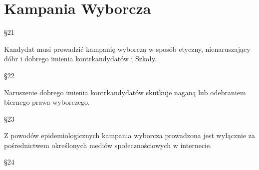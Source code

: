 \documentclass[12pt]{article}
\begin{document}
\section{Kampania Wyborcza}
    \begin{center}
        \S 21\\
    \end{center} 
    Kandydat musi prowadzić kampanię wyborczą w sposób etyczny, nienaruszający dóbr i dobrego imienia kontrkandydatów  i Szkoły.\\
    \begin{center}
        \S 22\\
    \end{center} 
    Naruszenie dobrego imienia kontrkandydatów skutkuje naganą lub odebraniem biernego prawa wyborczego.\\
    \begin{center}
        \S 23\\
    \end{center} 
    Z powodów epidemiologicznych kampania wyborcza prowadzona jest wyłącznie za pośrednictwem określonych mediów społecznościowych w internecie.\\
    \begin{center}
        \S 24\\
    \end{center} 
\end{document}
